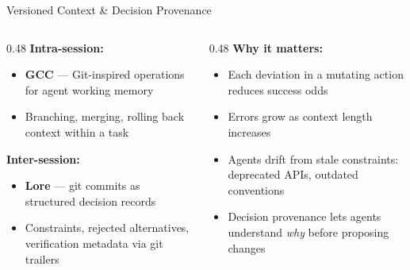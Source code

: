 \documentclass[aspectratio=169]{beamer}
\begin{document}
\begin{frame}{Versioned Context \& Decision Provenance}
  \begin{columns}[T]
    \begin{column}{0.48\textwidth}
      \textbf{Intra-session:}
      \begin{itemize}
        \item \textbf{GCC} --- Git-inspired operations for agent working memory
        \item Branching, merging, rolling back context within a task
      \end{itemize}

      \vspace{0.3cm}

      \textbf{Inter-session:}
      \begin{itemize}
        \item \textbf{Lore} --- git commits as structured decision records
        \item Constraints, rejected alternatives, verification metadata via git trailers
      \end{itemize}
    \end{column}

    \begin{column}{0.48\textwidth}
      \textbf{Why it matters:}
      \begin{itemize}
        \item Each deviation in a mutating action \alert{reduces success odds}
        \item Errors grow as context length increases
        \item Agents drift from stale constraints: deprecated APIs, outdated conventions
        \item \alert{Decision provenance} lets agents understand \emph{why} before proposing changes
      \end{itemize}
    \end{column}
  \end{columns}
\end{frame}
\end{document}
